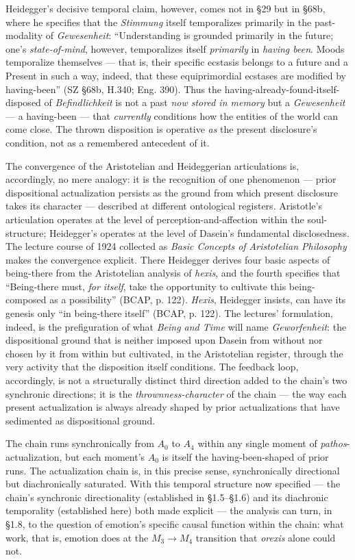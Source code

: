 Heidegger's decisive temporal claim, however, comes not in \S29 but in \S68b, where he specifies that the \textit{Stimmung} itself temporalizes primarily in the past-modality of \textit{Gewesenheit}: ``Understanding is grounded primarily in the future; one's \textit{state-of-mind}, however, temporalizes itself \textit{primarily} in \textit{having been}. Moods temporalize themselves --- that is, their specific ecstasis belongs to a future and a Present in such a way, indeed, that these equiprimordial ecstases are modified by having-been'' (SZ \S68b, H.340; Eng. 390). Thus the having-already-found-itself-disposed of \textit{Befindlichkeit} is not a past \textit{now stored in memory} but a \textit{Gewesenheit} --- a having-been --- that \textit{currently} conditions how the entities of the world can come close. The thrown disposition is operative \textit{as} the present disclosure's condition, not as a remembered antecedent of it.

The convergence of the Aristotelian and Heideggerian articulations is, accordingly, no mere analogy: it is the recognition of one phenomenon --- prior dispositional actualization persists as the ground from which present disclosure takes its character --- described at different ontological registers. Aristotle's articulation operates at the level of perception-and-affection within the soul-structure; Heidegger's operates at the level of Dasein's fundamental disclosedness. The lecture course of 1924 collected as \textit{Basic Concepts of Aristotelian Philosophy} makes the convergence explicit. There Heidegger derives four basic aspects of being-there from the Aristotelian analysis of \textit{hexis}, and the fourth specifies that ``Being-there must, \textit{for itself}, take the opportunity to cultivate this being-composed as a possibility'' (BCAP, p. 122). \textit{Hexis}, Heidegger insists, can have its genesis only ``in being-there itself'' (BCAP, p. 122). The lectures' formulation, indeed, is the prefiguration of what \textit{Being and Time} will name \textit{Geworfenheit}: the dispositional ground that is neither imposed upon Dasein from without nor chosen by it from within but cultivated, in the Aristotelian register, through the very activity that the disposition itself conditions. The feedback loop, accordingly, is not a structurally distinct third direction added to the chain's two synchronic directions; it is the \textit{thrownness-character} of the chain --- the way each present actualization is always already shaped by prior actualizations that have sedimented as dispositional ground.

The chain runs synchronically from $A_0$ to $A_4$ within any single moment of \textit{pathos}-actualization, but each moment's $A_0$ is itself the having-been-shaped of prior runs. The actualization chain is, in this precise sense, synchronically directional but diachronically saturated. With this temporal structure now specified --- the chain's synchronic directionality (established in \S1.5--\S1.6) and its diachronic temporality (established here) both made explicit --- the analysis can turn, in \S1.8, to the question of emotion's specific causal function within the chain: what work, that is, emotion does at the $M_3 \rightarrow M_4$ transition that \textit{orexis} alone could not.
